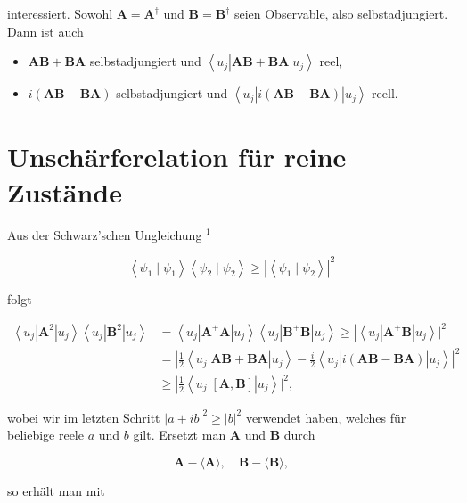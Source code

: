 \documentclass[10pt, letterpaper]{article}
\begin{document}
interessiert. Sowohl $\mathbf{A}=\mathbf{A}^{\dagger}$ und $\mathbf{B}=\mathbf{B}^{\dagger}$ seien Observable, also selbstadjungiert. Dann ist auch

\begin{itemize}
  \item $\mathbf{A B}+\mathbf{B A}$ selbstadjungiert und $\left\langle u_{j}\right| \mathbf{A B}+\mathbf{B A}\left|u_{j}\right\rangle$ reel,
  \item $i(\mathbf{A B}-\mathbf{B A})$ selbstadjungiert und $\left\langle u_{j}\right| i(\mathbf{A B}-\mathbf{B A})\left|u_{j}\right\rangle$ reell.
\end{itemize}

\section*{Unschärferelation für reine Zustände}
Aus der Schwarz'schen Ungleichung ${ }^{1}$

$$
\left\langle\psi_{1} \mid \psi_{1}\right\rangle\left\langle\psi_{2} \mid \psi_{2}\right\rangle \geq\left|\left\langle\psi_{1} \mid \psi_{2}\right\rangle\right|^{2}
$$

folgt

$$
\begin{aligned}
\left\langle u_{j}\right| \mathbf{A}^{2}\left|u_{j}\right\rangle\left\langle u_{j}\right| \mathbf{B}^{2}\left|u_{j}\right\rangle & \left.=\left\langle u_{j}\right| \mathbf{A}^{+} \mathbf{A}\left|u_{j}\right\rangle\left\langle u_{j}\right| \mathbf{B}^{+} \mathbf{B}\left|u_{j}\right\rangle \geq\left|\left\langle u_{j}\right| \mathbf{A}^{+} \mathbf{B}\right| u_{j}\right\rangle\left.\right|^{2} \\
& \left.=\left|\frac{1}{2}\left\langle u_{j}\right| \mathbf{A B}+\mathbf{B A}\right| u_{j}\right\rangle-\left.\frac{i}{2}\left\langle u_{j}\right| i(\mathbf{A B}-\mathbf{B A})\left|u_{j}\right\rangle\right|^{2} \\
& \left.\geq\left|\frac{1}{2}\left\langle u_{j}\right|[\mathbf{A}, \mathbf{B}]\right| u_{j}\right\rangle\left.\right|^{2},
\end{aligned}
$$

wobei wir im letzten Schritt $|a+i b|^{2} \geq|b|^{2}$ verwendet haben, welches für beliebige reele $a$ und $b$ gilt. Ersetzt man $\mathbf{A}$ und $\mathbf{B}$ durch

$$
\mathbf{A}-\langle\mathbf{A}\rangle, \quad \mathbf{B}-\langle\mathbf{B}\rangle,
$$

so erhält man mit
\end{document}
